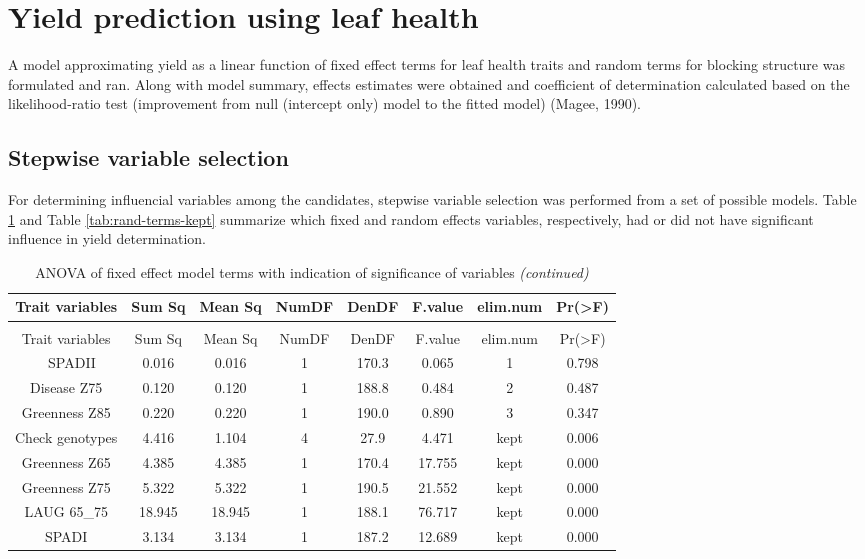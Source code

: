\documentclass[12pt,oneside]{dukestatscithesis} %
\theoremstyle{definition}
\theoremstyle{definition}
\theoremstyle{definition}
\theoremstyle{remark}
\begin{document}
\section{Yield prediction using leaf
health}\label{yield-prediction-using-leaf-health}

A model approximating yield as a linear function of fixed effect terms
for leaf health traits and random terms for blocking structure was
formulated and ran. Along with model summary, effects estimates were
obtained and coefficient of determination calculated based on the
likelihood-ratio test (improvement from null (intercept only) model to
the fitted model) (Magee, 1990).

\subsection{Stepwise variable
selection}\label{stepwise-variable-selection}

For determining influencial variables among the candidates, stepwise
variable selection was performed from a set of possible models. Table
\ref{tab:fixed-terms-kept} and Table \ref{tab:rand-terms-kept} summarize
which fixed and random effects variables, respectively, had or did not
have significant influence in yield determination.

\begingroup\fontsize{10}{12}\selectfont
\begin{longtable}[t]{cccccccc}
\caption{\label{tab:fixed-terms-kept}ANOVA of fixed effect model terms with indication of significance of variables}\\
\toprule
\textbf{Trait variables} & \textbf{Sum Sq} & \textbf{Mean Sq} & \textbf{NumDF} & \textbf{DenDF} & \textbf{F.value} & \textbf{elim.num} & \textbf{Pr(>F)}\\
\midrule
\endfirsthead
\caption[]{\label{tab:fixed-terms-kept}ANOVA of fixed effect model terms with indication of significance of variables \textit{(continued)}}\\
\toprule
Trait variables & Sum Sq & Mean Sq & NumDF & DenDF & F.value & elim.num & Pr(>F)\\
\midrule
\endhead
\
\endfoot
\bottomrule
\endlastfoot
SPADII & 0.016 & 0.016 & 1 & 170.3 & 0.065 & 1 & 0.798\\
Disease Z75 & 0.120 & 0.120 & 1 & 188.8 & 0.484 & 2 & 0.487\\
Greenness Z85 & 0.220 & 0.220 & 1 & 190.0 & 0.890 & 3 & 0.347\\
Check genotypes & 4.416 & 1.104 & 4 & 27.9 & 4.471 & kept & 0.006\\
Greenness Z65 & 4.385 & 4.385 & 1 & 170.4 & 17.755 & kept & 0.000\\
Greenness Z75 & 5.322 & 5.322 & 1 & 190.5 & 21.552 & kept & 0.000\\
LAUG 65\_75 & 18.945 & 18.945 & 1 & 188.1 & 76.717 & kept & 0.000\\
SPADI & 3.134 & 3.134 & 1 & 187.2 & 12.689 & kept & 0.000\\*
\end{longtable}
\endgroup{}
\end{document}

